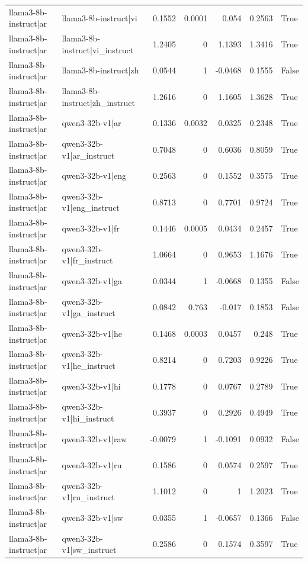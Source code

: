 \begin{table}
\begin{tabular}{l l r r r r l}
llama3-8b-instruct|ar & llama3-8b-instruct|vi & 0.1552 & 0.0001 & 0.054 & 0.2563 & True \\
llama3-8b-instruct|ar & llama3-8b-instruct|vi_instruct & 1.2405 & 0 & 1.1393 & 1.3416 & True \\
llama3-8b-instruct|ar & llama3-8b-instruct|zh & 0.0544 & 1 & -0.0468 & 0.1555 & False \\
llama3-8b-instruct|ar & llama3-8b-instruct|zh_instruct & 1.2616 & 0 & 1.1605 & 1.3628 & True \\
llama3-8b-instruct|ar & qwen3-32b-v1|ar & 0.1336 & 0.0032 & 0.0325 & 0.2348 & True \\
llama3-8b-instruct|ar & qwen3-32b-v1|ar_instruct & 0.7048 & 0 & 0.6036 & 0.8059 & True \\
llama3-8b-instruct|ar & qwen3-32b-v1|eng & 0.2563 & 0 & 0.1552 & 0.3575 & True \\
llama3-8b-instruct|ar & qwen3-32b-v1|eng_instruct & 0.8713 & 0 & 0.7701 & 0.9724 & True \\
llama3-8b-instruct|ar & qwen3-32b-v1|fr & 0.1446 & 0.0005 & 0.0434 & 0.2457 & True \\
llama3-8b-instruct|ar & qwen3-32b-v1|fr_instruct & 1.0664 & 0 & 0.9653 & 1.1676 & True \\
llama3-8b-instruct|ar & qwen3-32b-v1|ga & 0.0344 & 1 & -0.0668 & 0.1355 & False \\
llama3-8b-instruct|ar & qwen3-32b-v1|ga_instruct & 0.0842 & 0.763 & -0.017 & 0.1853 & False \\
llama3-8b-instruct|ar & qwen3-32b-v1|he & 0.1468 & 0.0003 & 0.0457 & 0.248 & True \\
llama3-8b-instruct|ar & qwen3-32b-v1|he_instruct & 0.8214 & 0 & 0.7203 & 0.9226 & True \\
llama3-8b-instruct|ar & qwen3-32b-v1|hi & 0.1778 & 0 & 0.0767 & 0.2789 & True \\
llama3-8b-instruct|ar & qwen3-32b-v1|hi_instruct & 0.3937 & 0 & 0.2926 & 0.4949 & True \\
llama3-8b-instruct|ar & qwen3-32b-v1|raw & -0.0079 & 1 & -0.1091 & 0.0932 & False \\
llama3-8b-instruct|ar & qwen3-32b-v1|ru & 0.1586 & 0 & 0.0574 & 0.2597 & True \\
llama3-8b-instruct|ar & qwen3-32b-v1|ru_instruct & 1.1012 & 0 & 1 & 1.2023 & True \\
llama3-8b-instruct|ar & qwen3-32b-v1|sw & 0.0355 & 1 & -0.0657 & 0.1366 & False \\
llama3-8b-instruct|ar & qwen3-32b-v1|sw_instruct & 0.2586 & 0 & 0.1574 & 0.3597 & True \\

\end{tabular}
\end{table}
